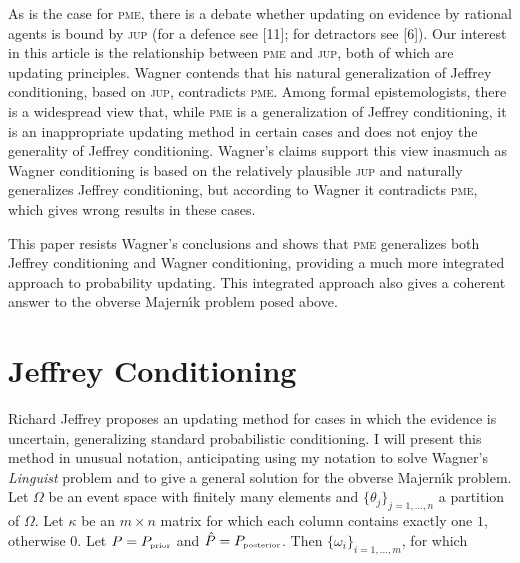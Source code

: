 \documentclass[entropy,article,submit,oneauthor,pdftex,12pt,a4paper]{mdpi}
\begin{document}
As is the case for \textsc{pme}, there is a debate whether updating on
evidence by rational agents is bound by \textsc{jup} (for a defence
see [11]; for detractors see [6]). Our interest in this article is the
relationship between \textsc{pme} and \textsc{jup}, both of which are
updating principles. Wagner contends that his natural generalization
of Jeffrey conditioning, based on \textsc{jup}, contradicts
\textsc{pme}. Among formal epistemologists, there is a widespread view
that, while \textsc{pme} is a generalization of Jeffrey conditioning,
it is an inappropriate updating method in certain cases and does not
enjoy the generality of Jeffrey conditioning. Wagner's claims support
this view inasmuch as Wagner conditioning is based on the relatively
plausible \textsc{jup} and naturally generalizes Jeffrey conditioning,
but according to Wagner it contradicts \textsc{pme}, which gives wrong
results in these cases.


This paper resists Wagner's conclusions and shows that \textsc{pme}
generalizes both Jeffrey conditioning and Wagner conditioning,
providing a much more integrated approach to probability updating.
This integrated approach also gives a coherent answer to the obverse
Majern{\'\i}k problem posed above.

\section{Jeffrey Conditioning}
\label{jc}

Richard Jeffrey proposes an updating method for cases in which the
evidence is uncertain, generalizing standard probabilistic
conditioning. I will present this method in unusual notation,
anticipating using my notation to solve Wagner's \emph{Linguist}
problem and to give a general solution for the obverse Majern{\'\i}k
problem. Let $\Omega$ be an event space with finitely many elements
and $\{\theta_{j}\}_{j=1,\ldots,n}$ a partition of $\Omega$. Let
$\kappa$ be an $m\times{}n$ matrix for which each column contains
exactly one $1$, otherwise $0$. Let $P=P_{\mbox{\tiny{prior}}}$ and
$\hat{P}=P_{\mbox{\tiny{posterior}}}$. Then
$\{\omega_{i}\}_{i=1,\ldots,m}$, for which
\end{document}
